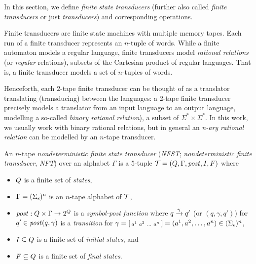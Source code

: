 In this section, we define \emph{finite state transducers} (further also called \emph{finite transducers} or just \emph{transducers}) and corresponding operations.

Finite transducers are finite state machines with multiple memory tapes.
Each run of a finite transducer represents an $n$-tuple of words.
While a finite automaton models a regular language,
finite transducers model \emph{rational relations} (or \emph{regular} relations), subsets of the Cartesian product of regular languages.
That is, a finite transducer models a set of $n$-tuples of words.

Henceforth, each $2$-tape finite transducer can be thought of as a translator translating (transducing) between the languages: a 2-tape finite transducer precisely models a translator from an input language to an output language, modelling a so-called \emph{binary rational relation}), a subset of $\Sigma^* \times \Sigma^*$.
In this work, we usually work with binary rational relations, but in general an \emph{n-ary rational relation} can be modelled by an $n$-tape transducer.

\begin{definition} \hfill \newline
An $n$-tape \emph{nondeterministic finite state transducer} (\emph{NFST}; \emph{nondeterministic finite transducer}, \emph{NFT}) over an alphabet $\Gamma$ is a 5-tuple $\mathcal{T} = (Q, \Gamma, \mathit{post}, I, F)$ where
\begin{itemize}
    \item $Q$ is a finite set of \emph{states},
    \item $\Gamma = (\Sigma_\epsilon)^n$ is an $n$-tape alphabet of $\mathcal{T}$,
    \item $\mathit{post}: Q \times \Gamma \rightarrow 2^{Q}$ is a \emph{symbol-post function}
    where ${q} \xrightarrow{{\gamma}} {q'}$ (or $(q, \gamma, q')$) for
    \\$q' \in \mathit{post}(q, \gamma)$ is a \emph{transition} for $\gamma = \begin{bsmallmatrix} a^1 & a^2 & \ldots & a^n\end{bsmallmatrix} = (a^1, a^2, \ldots, a^n) \in (\Sigma_\epsilon)^n$,
    \item $I \subseteq Q$ is a finite set of \emph{initial states}, and
    \item $F \subseteq Q$ is a finite set of \emph{final states}.
\end{itemize}
\end{definition}

